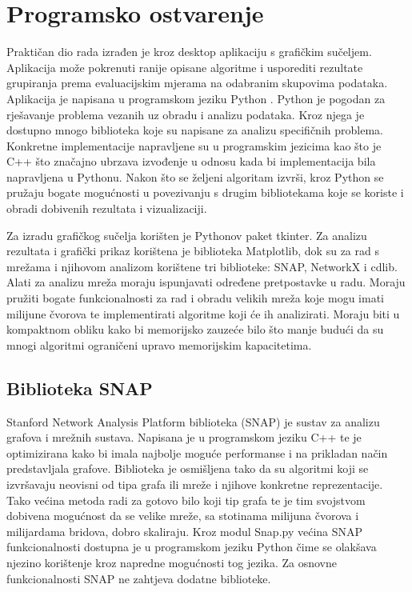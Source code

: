 \chapter{Programsko ostvarenje}

Praktičan dio rada izrađen je kroz desktop aplikaciju s grafičkim sučeljem. Aplikacija može pokrenuti ranije opisane algoritme i usporediti rezultate grupiranja prema evaluacijskim mjerama na odabranim skupovima podataka. Aplikacija je napisana u programskom jeziku Python \cite{van1995python}. Python je pogodan za rješavanje problema vezanih uz obradu i analizu podataka. Kroz njega je dostupno mnogo biblioteka koje su napisane za analizu specifičnih problema. Konkretne implementacije napravljene su u programskim jezicima kao što je C++ što značajno ubrzava izvođenje u odnosu kada bi implementacija bila napravljena u Pythonu. Nakon što se željeni algoritam izvrši, kroz Python se pružaju bogate mogućnosti u povezivanju s drugim bibliotekama koje se koriste i obradi dobivenih rezultata i vizualizaciji.

Za izradu grafičkog sučelja korišten je Pythonov paket tkinter. Za analizu rezultata i grafički prikaz korištena je biblioteka Matplotlib, dok su za rad s mrežama i njihovom analizom korištene tri biblioteke: SNAP, NetworkX i cdlib. Alati za analizu mreža moraju ispunjavati određene pretpostavke u radu. Moraju pružiti bogate funkcionalnosti za rad i obradu velikih mreža koje mogu imati milijune čvorova te implementirati algoritme koji će ih analizirati. Moraju biti u kompaktnom obliku kako bi memorijsko zauzeće bilo što manje	budući da su mnogi algoritmi ograničeni upravo memorijskim kapacitetima.

\section{Biblioteka SNAP}
Stanford Network Analysis Platform biblioteka (SNAP) \cite{leskovec2016snap} je sustav za analizu grafova i mrežnih sustava. Napisana je u programskom jeziku C++ te je optimizirana kako bi imala najbolje moguće performanse i na prikladan način predstavljala grafove. Biblioteka je osmišljena tako da su algoritmi koji se izvršavaju neovisni od tipa grafa ili mreže i njihove konkretne reprezentacije. Tako većina metoda radi za gotovo bilo koji tip grafa te je tim svojstvom dobivena mogućnost da se velike mreže, sa stotinama milijuna čvorova i milijardama bridova, dobro skaliraju. Kroz modul Snap.py većina SNAP funkcionalnosti dostupna je u programskom jeziku Python čime se olakšava njezino korištenje kroz napredne mogućnosti tog jezika. Za osnovne funkcionalnosti SNAP ne zahtjeva dodatne biblioteke. 

